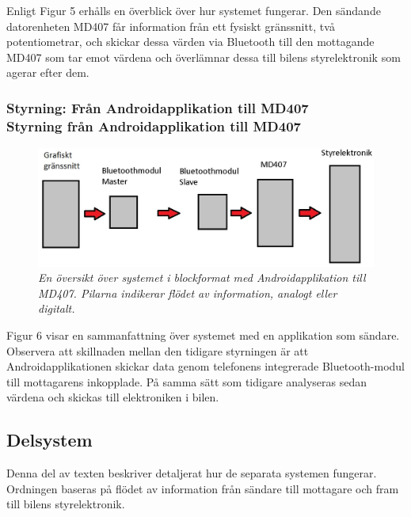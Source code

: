 \documentclass[a4paper]{article}
\begin{document}
Enligt Figur 5 erhålls en överblick över hur systemet fungerar. Den sändande datorenheten MD407 får information från ett fysiskt gränssnitt, två potentiometrar, och skickar dessa värden via Bluetooth till den mottagande MD407 som tar emot värdena och överlämnar dessa till bilens styrelektronik som agerar efter dem.

\subsubsection{Styrning: Från Androidapplikation till MD407 \\ Styrning från Androidapplikation till MD407}
\begin{figure}[H]
\includegraphics[width=\textwidth]{systemoversiktAndroid.jpg}
\centering
\caption{\it En översikt över systemet i blockformat med Androidapplikation till MD407. Pilarna indikerar flödet av information, analogt eller digitalt.}
\end{figure} 

Figur 6 visar en sammanfattning över systemet med en applikation som sändare. Observera att skillnaden mellan den tidigare styrningen är att Androidapplikationen skickar data genom telefonens integrerade Bluetooth-modul till mottagarens inkopplade. På samma sätt som tidigare analyseras sedan värdena och skickas till elektroniken i bilen.


\subsection{Delsystem}
Denna del av texten beskriver detaljerat hur de separata systemen fungerar. Ordningen baseras på flödet av information från sändare till mottagare och fram till bilens styrelektronik.
\end{document}
